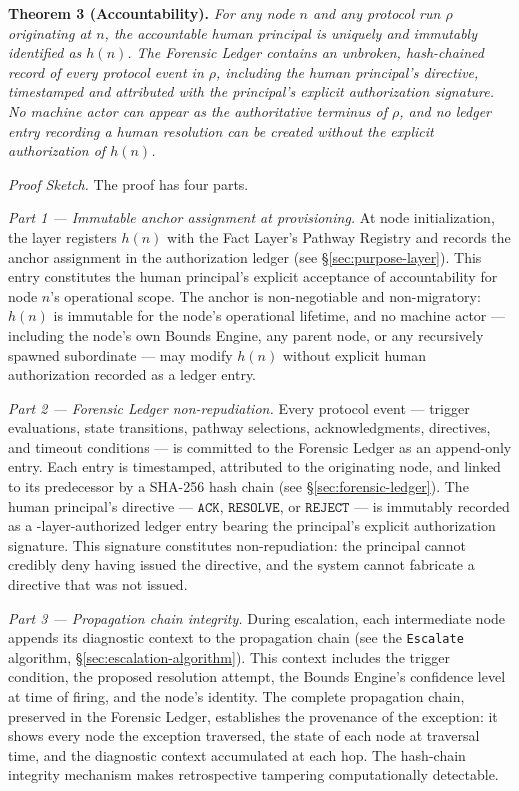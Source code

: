 \bigskip
\noindent\textbf{Theorem 3 (Accountability).}
\textit{For any node $n$ and any protocol run $\rho$ originating at $n$, the accountable human principal is uniquely and immutably identified as $h(n)$. The Forensic Ledger contains an unbroken, hash-chained record of every protocol event in $\rho$, including the human principal's directive, timestamped and attributed with the principal's explicit authorization signature. No machine actor can appear as the authoritative terminus of $\rho$, and no ledger entry recording a human resolution can be created without the explicit authorization of $h(n)$.}

\bigskip
\noindent\textit{Proof Sketch.} The proof has four parts.

\medskip
\noindent\textit{Part 1 — Immutable anchor assignment at provisioning.} At node initialization, the \purpose{} layer registers $h(n)$ with the Fact Layer's Pathway Registry and records the anchor assignment in the authorization ledger (see \S\ref{sec:purpose-layer}). This entry constitutes the human principal's explicit acceptance of accountability for node $n$'s operational scope. The anchor is non-negotiable and non-migratory: $h(n)$ is immutable for the node's operational lifetime, and no machine actor — including the node's own Bounds Engine, any parent node, or any recursively spawned subordinate — may modify $h(n)$ without explicit human authorization recorded as a ledger entry.

\medskip
\noindent\textit{Part 2 — Forensic Ledger non-repudiation.} Every protocol event — trigger evaluations, state transitions, pathway selections, acknowledgments, directives, and timeout conditions — is committed to the Forensic Ledger as an append-only entry. Each entry is timestamped, attributed to the originating node, and linked to its predecessor by a SHA-256 hash chain (see \S\ref{sec:forensic-ledger}). The human principal's directive — $\texttt{ACK}$, $\texttt{RESOLVE}$, or $\texttt{REJECT}$ — is immutably recorded as a \purpose-layer-authorized ledger entry bearing the principal's explicit authorization signature. This signature constitutes non-repudiation: the principal cannot credibly deny having issued the directive, and the system cannot fabricate a directive that was not issued.

\medskip
\noindent\textit{Part 3 — Propagation chain integrity.} During escalation, each intermediate node appends its diagnostic context to the propagation chain (see the \texttt{Escalate} algorithm, \S\ref{sec:escalation-algorithm}). This context includes the trigger condition, the proposed resolution attempt, the Bounds Engine's confidence level at time of firing, and the node's identity. The complete propagation chain, preserved in the Forensic Ledger, establishes the provenance of the exception: it shows every node the exception traversed, the state of each node at traversal time, and the diagnostic context accumulated at each hop. The hash-chain integrity mechanism makes retrospective tampering computationally detectable.

